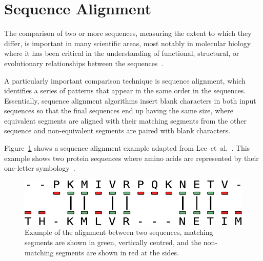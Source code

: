 
\section{Sequence Alignment}

The comparison of two or more sequences, measuring the extent to which they differ, is important in many scientific areas, most notably in molecular biology~\cite{needleman70,smith81,carrillo88,wang94} where it has been critical
in the understanding of functional, structural, or evolutionary relationships between the sequences~\cite{kruskal83,mount05book}.

A particularly important comparison technique is sequence alignment, which identifies a series of patterns that appear in the same order in the sequences.
Essentially, sequence alignment algorithms insert blank characters in both input sequences so that the final sequences end up having the same size, where equivalent segments are aligned with their matching segments from the other sequence and non-equivalent segments are paired with blank characters.

Figure~\ref{fig:seq-align-example} shows a sequence alignment example adapted from Lee~et~al.~\cite{lee02}.
This example shows two protein sequences where amino acids are represented by their one-letter symbology~\cite{aasland68}.

\begin{figure}[h]
  \centering
  \includegraphics[scale=0.55]{src/background/figs/seq-align-example}
  \caption{Example of the alignment between two sequences, matching segments are shown in green, vertically centred, and the non-matching segments are shown in red at the sides.}
  \label{fig:seq-align-example}
\end{figure}

